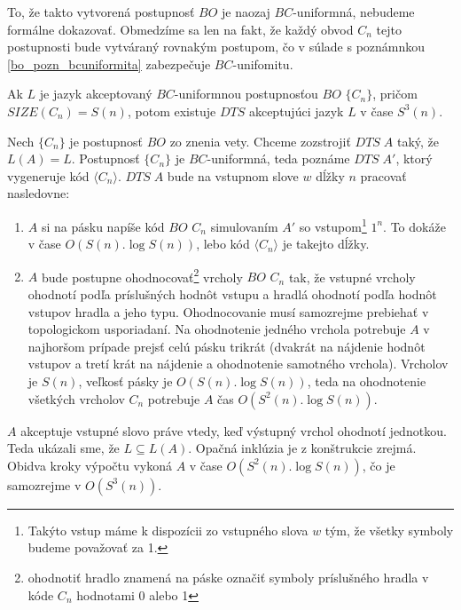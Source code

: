 {\begin{dokaz}
To, že takto vytvorená postupnosť $BO$ je naozaj $BC$-uniformná,
nebudeme formálne dokazovať. Obmedzíme sa len na fakt, že každý
obvod $C_n$ tejto postupnosti bude vytváraný rovnakým postupom, čo
v súlade s poznámnkou \ref{bo_pozn_bcuniformita} zabezpečuje
$BC$-unifomitu.
\end{dokaz}

\begin{veta}
\label{bo_veta_bosizetodtime}

Ak $L$ je jazyk akceptovaný $BC$-uniformnou postupnosťou $BO$ $\{
C_n\}$, pričom\linebreak $SIZE(C_n)=S(n)$, potom existuje $DTS$
akceptujúci jazyk $L$ v čase $S^3(n)$.
\end{veta}

\begin{dokaz}
Nech $\{ C_n\}$ je postupnosť $BO$ zo znenia vety. Chceme
zozstrojiť $DTS\; A$ taký, že $L(A)=L$. Postupnosť $\{ C_n\}$ je
$BC$-uniformná, teda poznáme $DTS\; A'$, ktorý vygeneruje kód
$\langle C_n\rangle$. $DTS\; A$ bude na vstupnom slove $w$ dĺžky
$n$ pracovať nasledovne:
\begin{enumerate}
  \item $A$ si na pásku napíše kód $BO$ $C_n$ simulovaním $A'$
  so vstupom\footnote{Takýto vstup máme k dispozícii zo vstupného
  slova $w$ tým, že všetky symboly budeme považovať za 1.} $1^n$.
  To dokáže v čase $O(S(n).\log S(n))$, lebo kód
  $\langle C_n\rangle$ je takejto dĺžky.
  \item $A$ bude postupne ohodnocovať\footnote{ohodnotiť hradlo
  znamená na páske označiť symboly príslušného hradla v kóde $C_n$
  hodnotami 0 alebo 1}
  vrcholy $BO$ $C_n$ tak, že vstupné vrcholy ohodnotí podľa
  príslušných hodnôt vstupu a hradlá ohodnotí podľa hodnôt vstupov
  hradla a jeho typu. Ohodnocovanie musí samozrejme prebiehať v topologickom
  usporiadaní. Na ohodnotenie jedného vrchola potrebuje $A$ v
  najhoršom prípade prejsť celú pásku trikrát (dvakrát na nájdenie
  hodnôt vstupov a tretí krát na nájdenie a ohodnotenie samotného
  vrchola). Vrcholov je $S(n)$, veľkosť pásky je $O(S(n).\log S(n))$,
  teda na ohodnotenie všetkých vrcholov $C_n$ potrebuje $A$ čas
  $O(S^2(n).\log S(n))$.
\end{enumerate}
$A$ akceptuje vstupné slovo práve vtedy, keď výstupný vrchol
ohodnotí jednotkou. Teda ukázali sme, že $L\subseteq L(A)$. Opačná
inklúzia je z konštrukcie zrejmá. Obidva kroky výpočtu vykoná $A$
v čase $O(S^2(n).\log S(n))$, čo je samozrejme v $O(S^3(n))$.
\end{dokaz}

}
